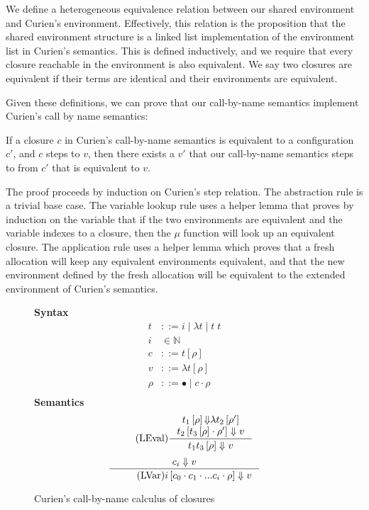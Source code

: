 We define a heterogeneous equivalence relation between our shared environment
and Curien's environment. Effectively, this relation is the proposition that
the shared environment structure is a linked list implementation of the
environment list in Curien's semantics. This is defined inductively, and we
require that every closure reachable in the environment is also equivalent.  We
say two closures are equivalent if their terms are identical and their
environments are equivalent. 

Given these definitions, we can prove that our call-by-name semantics implement
Curien's call by name semantics: 

\begin{thm}
If a closure $c$ in Curien's call-by-name semantics is equivalent to a
configuration $c'$, and $c$ steps to $v$, then there exists a $v'$ that our
call-by-name semantics steps to from $c'$ that is equivalent to $v$.
\end{thm}
\begin{proofoutline}
The proof proceeds by induction on Curien's step relation. The abstraction rule
is a trivial base case. The variable lookup rule uses a helper lemma that proves
by induction on the variable that if the two environments are equivalent and the
variable indexes to a closure, then the $\mu$ function will look up an
equivalent closure. The application rule uses a helper lemma which proves that a
fresh allocation will keep any equivalent environments equivalent, and that the
new environment defined by the fresh allocation will be equivalent to the
extended environment of Curien's semantics.
\end{proofoutline}

\begin{figure}
\textbf{Syntax}
\begin{align*}
\tag{Term} t &::= i \; | \; \lambda t \; | \; t \; t  \\
\tag{Variable} i &\in \mathbb{N}  \\
\tag{Closure} c &::= t \left[\rho\right] \\
\tag{Value} v &::= \lambda t \left[\rho\right] \\
\tag{Environment} \rho &::= \bullet \; | \; c \cdot \rho \\
\end{align*}
\textbf{Semantics}
\begin{align*}
\tag{LEval}\inference
{t_1\left[\rho\right] {\Downarrow} \lambda t_2\left[\rho'\right] \\ 
 t_2\left[t_3\left[\rho\right] \cdot \rho'\right] \Downarrow v}
{t_1 t_3\left[\rho\right] \Downarrow v } 
\end{align*}
\begin{align*}
\inference
{c_i \Downarrow v}
{\tag{LVar} i \left[c_0 \cdot c_1 \cdot ... c_i \cdot \rho\right] \Downarrow v}
\end{align*}
\caption{Curien's call-by-name calculus of closures}
\label{fig:curien}
\end{figure}

